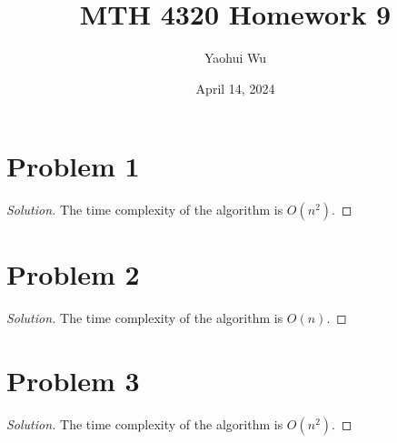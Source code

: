 \documentclass[12pt]{article}
\title{MTH 4320 Homework 9}
\author{Yaohui Wu}
\date{April 14, 2024}
\newenvironment*{solution}{\begin{proof}[Solution]}{\end{proof}}
\begin{document}
\maketitle
\section*{Problem 1}
\begin{solution}
    The time complexity of the algorithm is \(O(n^2)\).
\end{solution}
\section*{Problem 2}
\begin{solution}
    The time complexity of the algorithm is \(O(n)\).
\end{solution}
\section*{Problem 3}
\begin{solution}
    The time complexity of the algorithm is \(O(n^2)\).
\end{solution}
\end{document}
